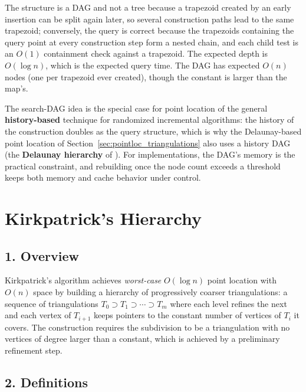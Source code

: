 The structure is a DAG and not a tree because a trapezoid created by an
early insertion can be split again later, so several construction paths
lead to the same trapezoid; conversely, the query is correct because the
trapezoids containing the query point at every construction step form a
nested chain, and each child test is an $O(1)$ containment check against a
trapezoid. The expected depth is $O(\log n)$, which is the expected query
time. The DAG has expected $O(n)$ nodes (one per trapezoid ever created),
though the constant is larger than the map's.

The search-DAG idea is the special case for point location of the general
\textbf{history-based} technique for randomized incremental algorithms: the
history of the construction doubles as the query structure, which is why
the Delaunay-based point location of Section~\ref{sec:pointloc_triangulations}
also uses a history DAG (the \textbf{Delaunay hierarchy} of
\cite{devillers2002}). For implementations, the DAG's memory is the
practical constraint, and rebuilding once the node count exceeds a threshold
keeps both memory and cache behavior under control.


\section{Kirkpatrick's Hierarchy}
\label{sec:pointloc_kirkpatrick}

\subsection{1. Overview}

Kirkpatrick's algorithm \cite{kirkpatrick1983} achieves \emph{worst-case}
$O(\log n)$ point location with $O(n)$ space by building a hierarchy of
progressively coarser triangulations: a sequence of triangulations
$T_0 \supset T_1 \supset \cdots \supset T_m$ where each level refines the
next and each vertex of $T_{i+1}$ keeps pointers to the constant number of
vertices of $T_i$ it covers. The construction requires the subdivision to
be a triangulation with no vertices of degree larger than a constant, which
is achieved by a preliminary refinement step.

\subsection{2. Definitions}

